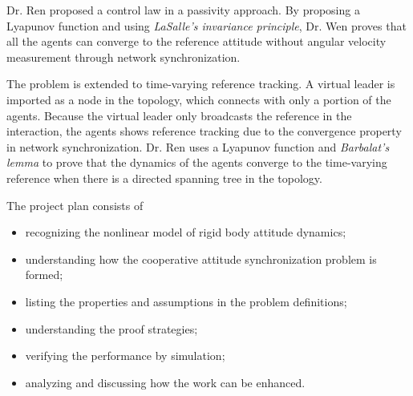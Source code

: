 \documentclass{llncs}
\begin{document}
Dr. Ren proposed a control law in a passivity approach.
By proposing a Lyapunov function and using \emph{LaSalle's invariance principle}, Dr. Wen proves that all the agents can converge to the reference attitude without angular velocity measurement through network synchronization.

The problem is extended to time-varying reference tracking.
A virtual leader is imported as a node in the topology, which connects with only a portion of the agents.
Because the virtual leader only broadcasts the reference in the interaction, the agents shows reference tracking due to the convergence property in network synchronization.
Dr. Ren uses a Lyapunov function and \emph{Barbalat's lemma} to prove that the dynamics of the agents converge to the time-varying reference when there is a directed spanning tree in the topology. 

The project plan consists of 
\begin{itemize}
\item recognizing the nonlinear model of rigid body attitude dynamics;
\item understanding how the cooperative attitude synchronization problem is formed;
\item listing the properties and assumptions in the problem definitions;
\item understanding the proof strategies;
\item verifying the performance by simulation;
\item analyzing and discussing how the work can be enhanced.
\end{itemize}



%
%


\end{document}
